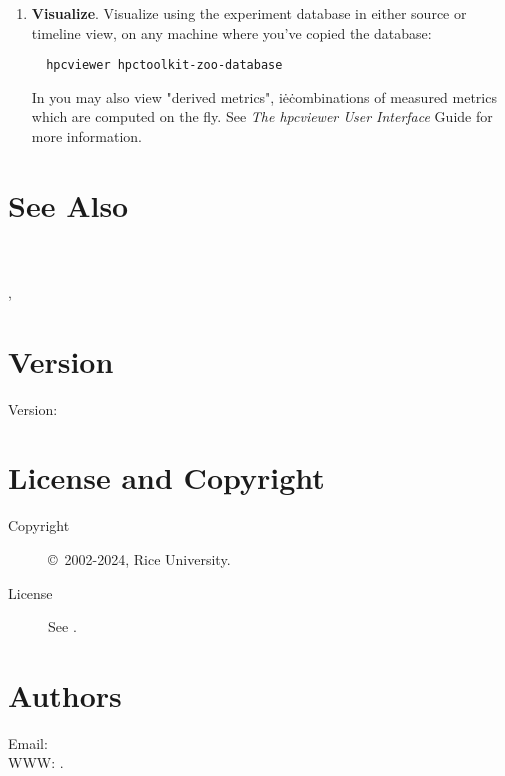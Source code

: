 \documentclass[english]{article}
\begin{document}
\begin{enumerate}
\item \textbf{Visualize}.
Visualize using 
the experiment database in either source or timeline view,
on any machine where you've copied the database:
\begin{verbatim}
  hpcviewer hpctoolkit-zoo-database
\end{verbatim}
In  you may also view "derived metrics",
i\.e\. combinations of measured metrics which are computed on the fly.
See \emph{The hpcviewer User Interface} Guide for more information.

\end{enumerate}



\section{See Also}

 \\
 \\
,
   \\

\section{Version}

Version: \Version

\section{License and Copyright}

\begin{description}
\item[Copyright] \copyright\ 2002-2024, Rice University.
\item[License] See .
\end{description}

\section{Authors}

Email:  \\
WWW: .

\LatexManEnd
\end{document}
